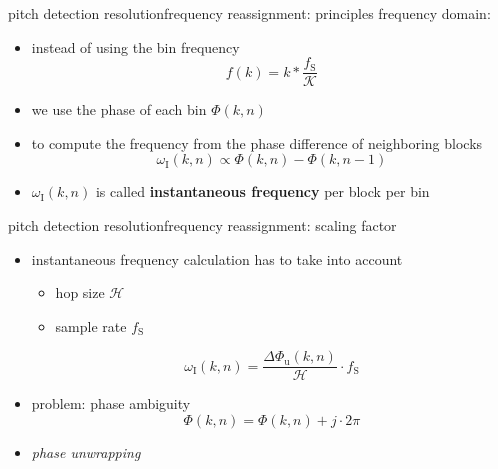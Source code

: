         \begin{frame}{pitch detection resolution}{frequency reassignment: principles}
            frequency domain:
            \begin{itemize}
                \item   instead of using the bin frequency
                    \[ f(k) = k*\frac{f_\mathrm{S}}{\mathcal{K}}\]
                \item   we use the phase of each bin $\Phi(k,n)$
                \item   to compute the frequency from the phase difference of neighboring blocks
                    \begin{equation*}\label{eq:phasediff}
                        \omega_{\mathrm{I}}(k,n)	\propto \Phi(k,n)-\Phi(k,n-1)
                    \end{equation*}
                \item<2->   $\omega_{\mathrm{I}}(k,n)$ is called \textbf{instantaneous frequency} per block per bin
            \end{itemize}
        \end{frame}
        \begin{frame}{pitch detection resolution}{frequency reassignment: scaling factor}
            \begin{itemize}
                \item instantaneous frequency calculation has to take into account
                    \begin{itemize}
                        \item   hop size $\mathcal{H}$
                        \item   sample rate $f_\mathrm{S}$
                    \end{itemize}
                
                    \begin{equation*}
                        \omega_{\mathrm{I}}(k,n) = \frac{\Delta\Phi_{\mathrm{u}}(k,n)}{\mathcal{H}}\cdot f_{\mathrm{S}} 
                    \end{equation*}
                \item<2-> problem: phase ambiguity
                    \begin{equation*}
                        \Phi(k,n) = \Phi(k,n) + j\cdot 2\pi
                    \end{equation*}
                \item<3->[$\Rightarrow$] \textit{phase unwrapping}
            \end{itemize}
        \end{frame}
